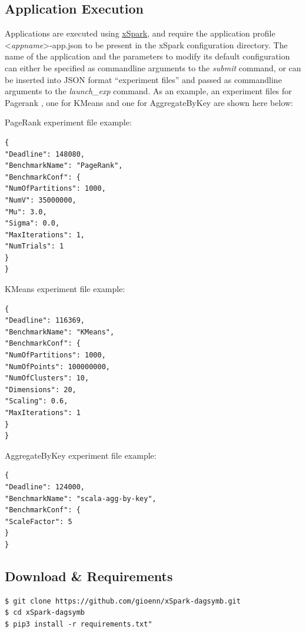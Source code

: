 \hypertarget{application-execution}{%
\subsection{Application Execution}\label{application-execution}}

Applications are executed using
\href{https://github.com/gioenn/xSpark.git}{xSpark}, and require the
application profile <\emph{appname}>-app.json to be present in the
xSpark configuration directory. The name of the application and the
parameters to modify its default configuration can either be specified
as commandline arguments to the \emph{submit} command, or can be
inserted into JSON format ``experiment files'' and passed as commandline
arguments to the \emph{launch\_exp} command. As an example, an
experiment files for Pagerank , one for KMeans and one for
AggregateByKey are shown here below:

PageRank experiment file example:

\begin{verbatim}
{
"Deadline": 148080,
"BenchmarkName": "PageRank",
"BenchmarkConf": {
"NumOfPartitions": 1000,
"NumV": 35000000,
"Mu": 3.0,
"Sigma": 0.0,
"MaxIterations": 1,
"NumTrials": 1     
}
}
\end{verbatim}

KMeans experiment file example:

\begin{verbatim}
{
"Deadline": 116369,
"BenchmarkName": "KMeans",
"BenchmarkConf": {
"NumOfPartitions": 1000,
"NumOfPoints": 100000000,
"NumOfClusters": 10,
"Dimensions": 20,
"Scaling": 0.6,
"MaxIterations": 1
}
}
\end{verbatim}

AggregateByKey experiment file example:

\begin{verbatim}
{
"Deadline": 124000,
"BenchmarkName": "scala-agg-by-key",
"BenchmarkConf": {
"ScaleFactor": 5
}
}
\end{verbatim}

\hypertarget{download-requirements}{%
\subsection{Download \& Requirements}\label{download-requirements}}

\begin{verbatim}
$ git clone https://github.com/gioenn/xSpark-dagsymb.git
$ cd xSpark-dagsymb
$ pip3 install -r requirements.txt"
\end{verbatim}

